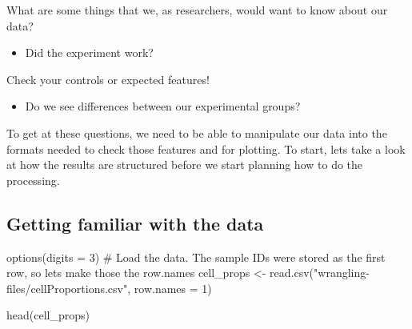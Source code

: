 \documentclass[
  letterpaper,
  DIV=11,
  numbers=noendperiod]{scrreprt}
\newenvironment{Shaded}{\begin{snugshade}}{\end{snugshade}}
\newcommand{\AttributeTok}[1]{\textcolor[rgb]{0.40,0.45,0.13}{#1}}
\newcommand{\CommentTok}[1]{\textcolor[rgb]{0.37,0.37,0.37}{#1}}
\newcommand{\DecValTok}[1]{\textcolor[rgb]{0.68,0.00,0.00}{#1}}
\newcommand{\FunctionTok}[1]{\textcolor[rgb]{0.28,0.35,0.67}{#1}}
\newcommand{\NormalTok}[1]{\textcolor[rgb]{0.00,0.23,0.31}{#1}}
\newcommand{\OtherTok}[1]{\textcolor[rgb]{0.00,0.23,0.31}{#1}}
\newcommand{\StringTok}[1]{\textcolor[rgb]{0.13,0.47,0.30}{#1}}
\providecommand{\tightlist}{%
  \setlength{\itemsep}{0pt}\setlength{\parskip}{0pt}}\usepackage{longtable,booktabs,array}
\begin{document}
What are some things that we, as researchers, would want to know about
our data?

\begin{itemize}
\tightlist
\item
  Did the experiment work?
\end{itemize}

\begin{tcolorbox}[enhanced jigsaw, left=2mm, colframe=quarto-callout-note-color-frame, leftrule=.75mm, opacitybacktitle=0.6, toptitle=1mm, title=\textcolor{quarto-callout-note-color}{\faInfo}\hspace{0.5em}{Note}, opacityback=0, coltitle=black, colbacktitle=quarto-callout-note-color!10!white, breakable, colback=white, titlerule=0mm, bottomrule=.15mm, arc=.35mm, bottomtitle=1mm, rightrule=.15mm, toprule=.15mm]

Check your controls or expected features!

\end{tcolorbox}

\begin{itemize}
\tightlist
\item
  Do we see differences between our experimental groups?
\end{itemize}

To get at these questions, we need to be able to manipulate our data
into the formats needed to check those features and for plotting. To
start, lets take a look at how the results are structured before we
start planning how to do the processing.

\hypertarget{getting-familiar-with-the-data}{%
\subsection{Getting familiar with the
data}\label{getting-familiar-with-the-data}}

\begin{Shaded}
\begin{Highlighting}[]
\FunctionTok{options}\NormalTok{(}\AttributeTok{digits =} \DecValTok{3}\NormalTok{)}
\CommentTok{\# Load the data. The sample IDs were stored as the first row, so lets make those the row.names}
\NormalTok{cell\_props }\OtherTok{\textless{}{-}} \FunctionTok{read.csv}\NormalTok{(}\StringTok{"wrangling{-}files/cellProportions.csv"}\NormalTok{,}
                       \AttributeTok{row.names =} \DecValTok{1}\NormalTok{)}

\FunctionTok{head}\NormalTok{(cell\_props)}
\end{Highlighting}
\end{Shaded}
\end{document}
